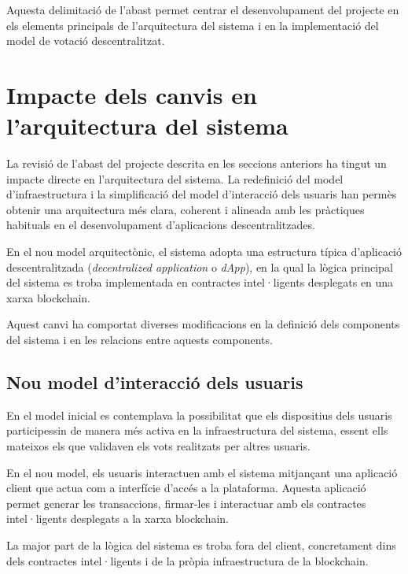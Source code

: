 \documentclass[12pt,a4paper]{article}
\begin{document}
Aquesta delimitació de l'abast permet centrar el desenvolupament del projecte en els elements principals de l'arquitectura del sistema i en la implementació del model de votació descentralitzat.


\section{Impacte dels canvis en l'arquitectura del sistema}

La revisió de l'abast del projecte descrita en les seccions anteriors ha tingut un impacte directe en l'arquitectura del sistema. La redefinició del model d'infraestructura i la simplificació del model d'interacció dels usuaris han permès obtenir una arquitectura més clara, coherent i alineada amb les pràctiques habituals en el desenvolupament d'aplicacions descentralitzades.

En el nou model arquitectònic, el sistema adopta una estructura típica d'aplicació descentralitzada (\textit{decentralized application} o \textit{dApp}), en la qual la lògica principal del sistema es troba implementada en contractes intel·ligents desplegats en una xarxa blockchain.

Aquest canvi ha comportat diverses modificacions en la definició dels components del sistema i en les relacions entre aquests components.

\subsection{Nou model d'interacció dels usuaris}

En el model inicial es contemplava la possibilitat que els dispositius dels usuaris participessin de manera més activa en la infraestructura del sistema, essent ells mateixos els que validaven els vots realitzats per altres usuaris.

En el nou model, els usuaris interactuen amb el sistema mitjançant una aplicació client que actua com a interfície d'accés a la plataforma. Aquesta aplicació permet generar les transaccions, firmar-les i interactuar amb els contractes intel·ligents desplegats a la xarxa blockchain.

La major part de la lògica del sistema es troba fora del client, concretament dins dels contractes intel·ligents i de la pròpia infraestructura de la blockchain.
\end{document}
